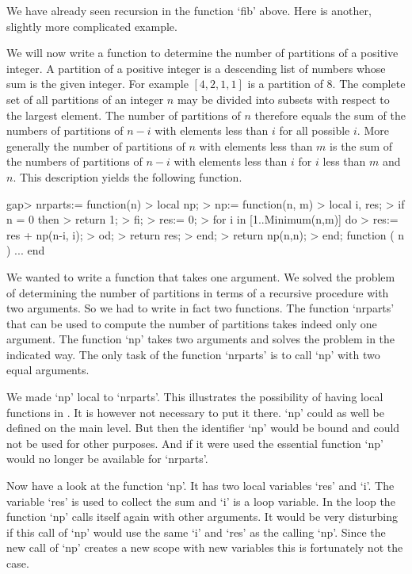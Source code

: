 
We  have  already seen recursion  in the  function `fib'  above.  Here is
another, slightly more complicated example.

We will now write  a function to  determine the number of partitions of a
positive integer.  A partition of a positive integer is a descending list
of  numbers whose sum is the given integer.  For example $[4,2,1,1]$ is a
partition of 8.  The complete set of all partitions of an integer $n$ may
be divided into subsets with respect to the largest  element.  The number
of  partitions of  $n$  therefore  equals  the  sum  of  the  numbers  of
partitions  of $n-i$ with  elements less than  $i$ for all possible  $i$.
More generally the  number of partitions of  $n$ with elements  less than
$m$ is the sum  of  the numbers of partitions of $n-i$ with elements less
than  $i$ for $i$ less than  $m$ and  $n$.  This description  yields  the
following function.

\beginexample
    gap> nrparts:= function(n)
    >    local np;
    >    np:= function(n, m)
    >       local i, res;
    >       if n = 0 then
    >          return 1;
    >       fi;
    >       res:= 0;
    >       for i in [1..Minimum(n,m)] do
    >          res:= res + np(n-i, i);
    >       od;
    >       return res;
    >    end;
    >    return np(n,n);
    > end;
    function ( n ) ... end
\endexample

We wanted to  write a function that  takes one argument.   We solved  the
problem of determining the number  of partitions in  terms of a recursive
procedure with two arguments.  So we had to write  in fact two functions.
The  function  `nrparts' that  can  be  used  to  compute the  number  of
partitions takes indeed only one  argument.  The  function `np' takes two
arguments and solves the problem in the indicated way.  The  only task of
the function `nrparts' is to call `np' with two equal arguments.

We made `np'  local to `nrparts'.   This  illustrates the  possibility of
having local functions in {\GAP}.   It is however not necessary to put it
there.  `np' could as  well be defined on the main level.   But  then the
identifier `np'  would be bound and could not be used for other purposes.
And  if  it were used  the essential  function  `np' would no  longer  be
available for `nrparts'.

Now have  a look at the function  `np'.  It has two local variables `res'
and `i'.  The variable `res' is used to collect the sum and `i' is a loop
variable.  In the loop  the  function `np' calls itself again with  other
arguments.  It would be  very disturbing if this call of  `np' would  use
the same `i' and `res'  as  the calling `np'.  Since the new call of `np'
creates a new scope with new variables this is fortunately not the case.

